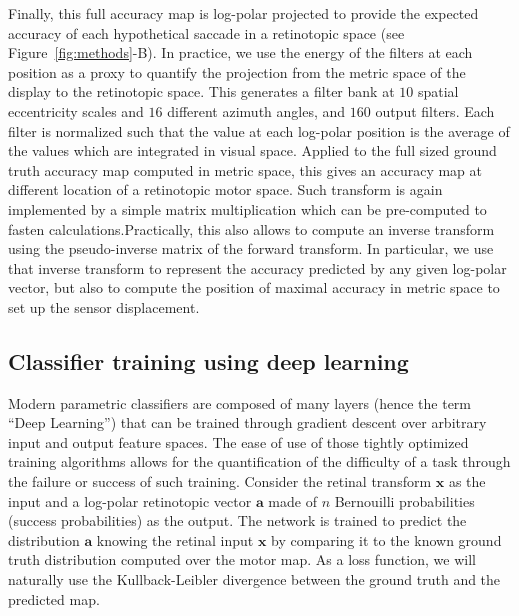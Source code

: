 Finally, this full accuracy map is log-polar projected to provide the expected accuracy of each hypothetical saccade in a retinotopic space (see  Figure~\ref{fig:methods}-B). In practice, we use the energy of the filters at each position as a proxy to quantify the projection from the metric space of the display to the retinotopic space. This generates a filter bank at $10$ spatial eccentricity scales and $16$ different azimuth angles, and $160$ output filters. Each filter is normalized such that the value at each log-polar position is the average of the values which are integrated in visual space. Applied to the full sized ground truth accuracy map computed in metric space, this gives an accuracy map at different location of a retinotopic motor space. \ICANN Such transform is again implemented by a simple matrix multiplication which can be pre-computed to fasten calculations.\fi Practically, this also allows to compute an inverse transform using the pseudo-inverse matrix of the forward transform. In particular, we use that inverse transform to represent the accuracy predicted by any given log-polar vector, but also to compute the position of maximal accuracy in metric space to set up the sensor displacement.


\subsection{Classifier training using deep learning}
Modern parametric classifiers are composed of many layers (hence the term ``Deep Learning'') that can be trained through gradient descent over arbitrary input and output feature spaces. The ease of use of those tightly optimized training algorithms allows for the quantification of the difficulty of a task through the failure or success of such training. Consider the retinal transform $\boldsymbol{x}$ as the input and a log-polar retinotopic vector $\boldsymbol{a}$ made of $n$ Bernouilli probabilities (success probabilities) as the output. %
The network is trained to predict the distribution $\boldsymbol{a}$ knowing the retinal input $\boldsymbol{x}$ by comparing it to the known ground truth distribution computed over the motor map. As a loss function, we will naturally use the Kullback-Leibler divergence between the ground truth and the predicted map.

